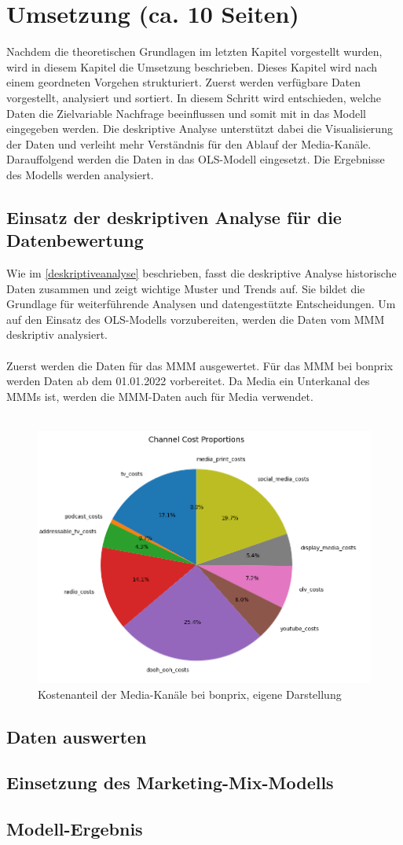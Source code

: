 \newpage
\section{Umsetzung (ca. 10 Seiten)}
Nachdem die theoretischen Grundlagen im letzten Kapitel vorgestellt wurden, wird in diesem Kapitel die Umsetzung beschrieben. Dieses Kapitel wird nach einem geordneten Vorgehen strukturiert. Zuerst werden verfügbare Daten vorgestellt, analysiert und sortiert. In diesem Schritt wird entschieden, welche Daten die Zielvariable Nachfrage beeinflussen und somit mit in das Modell eingegeben werden. Die deskriptive Analyse unterstützt dabei die Visualisierung der Daten und verleiht mehr Verständnis für den Ablauf der Media-Kanäle. Darauffolgend werden die Daten in das OLS-Modell eingesetzt. Die Ergebnisse des Modells werden analysiert.
\subsection{Einsatz der deskriptiven Analyse für die Datenbewertung}
Wie im \autoref{deskriptiveanalyse} beschrieben, fasst die deskriptive Analyse historische Daten zusammen und zeigt wichtige Muster und Trends auf. Sie bildet die Grundlage für weiterführende Analysen und datengestützte Entscheidungen. Um auf den Einsatz des OLS-Modells vorzubereiten, werden die Daten vom \ac{MMM} deskriptiv analysiert. \\\\
Zuerst werden die Daten für das \ac{MMM} ausgewertet. Für das \ac{MMM} bei bonprix werden Daten ab dem 01.01.2022 vorbereitet. Da Media ein Unterkanal des \ac{MMM}s ist, werden die \ac{MMM}-Daten auch für Media verwendet. \\\\

\begin{figure}[ht]
    \centering
    \includegraphics[width=0.8\linewidth]{images/mediapie.png}
    \caption{Kostenanteil der Media-Kanäle bei bonprix, eigene Darstellung}
    \label{fig:enter-label}
\end{figure}

\subsection{Daten auswerten}
\subsection{Einsetzung des Marketing-Mix-Modells}
\subsection{Modell-Ergebnis}
